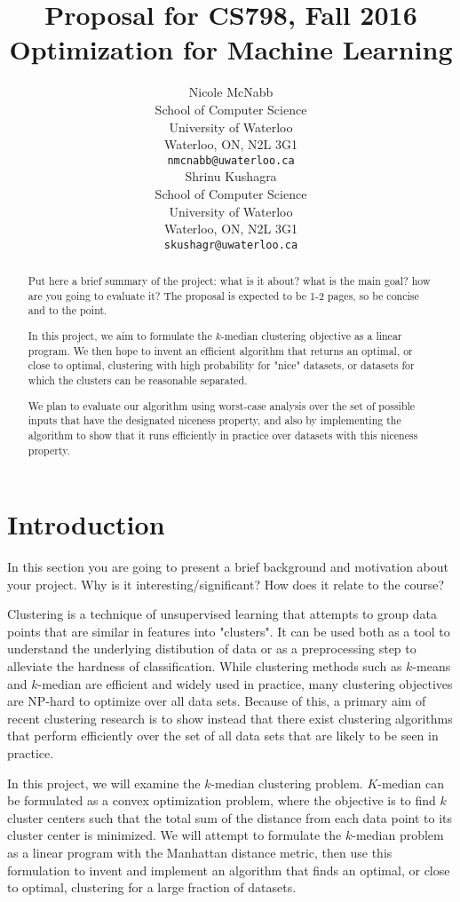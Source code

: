 \documentclass{article}
\title{Proposal for CS798, Fall 2016\\ \large Optimization for Machine Learning}
\author{
	Nicole McNabb \\
	School of Computer Science\\
	University of Waterloo\\
	Waterloo, ON, N2L 3G1 \\
	\texttt{nmcnabb@uwaterloo.ca} \\
	\And
	Shrinu Kushagra\\
	School of Computer Science\\
	University of Waterloo\\
	Waterloo, ON, N2L 3G1 \\
	\texttt{skushagr@uwaterloo.ca} \\	
}
\begin{document}
\maketitle

\begin{abstract} 
Put here a brief summary of the project: what is it about? what is the main goal? how are you going to evaluate it? The proposal is expected to be 1-2 pages, so be concise and to the point.

In this project, we aim to formulate the $k$-median clustering objective as a linear program. We then hope to invent an efficient algorithm that returns an optimal, or close to optimal, clustering with high probability for "nice" datasets, or datasets for which the clusters can be reasonable separated. 

We plan to evaluate our algorithm using worst-case analysis over the set of possible inputs that have the designated niceness property, and also by implementing the algorithm to show that it runs efficiently in practice over datasets with this niceness property.
\end{abstract} 

\section{Introduction}
In this section you are going to present a brief background and motivation about your project. Why is it interesting/significant? How does it relate to the course?

Clustering is a technique of unsupervised learning that attempts to group data points that are similar in features into "clusters". It can be used both as a tool to understand the underlying distibution of data or as a preprocessing step to alleviate the hardness of classification. While clustering methods such as $k$-means and $k$-median are efficient and widely used in practice, many clustering objectives are NP-hard to optimize over all data sets. Because of this, a primary aim of recent clustering research is to show instead that there exist  clustering algorithms that perform efficiently over the set of all data sets that are likely to be seen in practice.

In this project, we will examine the $k$-median clustering problem. $K$-median can be formulated as a convex optimization problem, where the objective is to find $k$ cluster centers such that the total sum of the distance from each data point to its cluster center is minimized. We will attempt to formulate the $k$-median problem as a linear program with the Manhattan distance metric, then use this formulation to invent and implement an algorithm that finds an optimal, or close to optimal, clustering for a large fraction of datasets.
\end{document}
